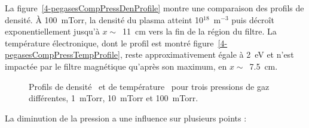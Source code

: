 \begin{refsection}
	La
	figure~\ref{4-pegasesCompPressDenProfile} montre une comparaison des profils
	de densité. À 100~mTorr, la densité du plasma atteint 10$^{18}$~m$^{-3}$ puis
	décroît exponentiellement jusqu'à $x\sim\,$ 11~cm vers la fin de la région
	du filtre. 
	La température électronique, dont le profil est montré
	figure~\ref{4-pegasesCompPressTempProfile}, reste approximativement égale à
	2~eV et n'est impactée par le filtre magnétique qu'après son maximum, en $x\sim\,$ 7.5~cm.
\begin{figure}[!htbp]
  \centering
    \caption{Profils de densité~ et de
    température~ pour trois pressions de
    gaz différentes, 1~mTorr, 10~mTorr et 100~mTorr.}
    \label{pegasesCompPressProfils}
\end{figure}
	La diminution de la pression a une influence sur plusieurs points :
	

\end{refsection}
